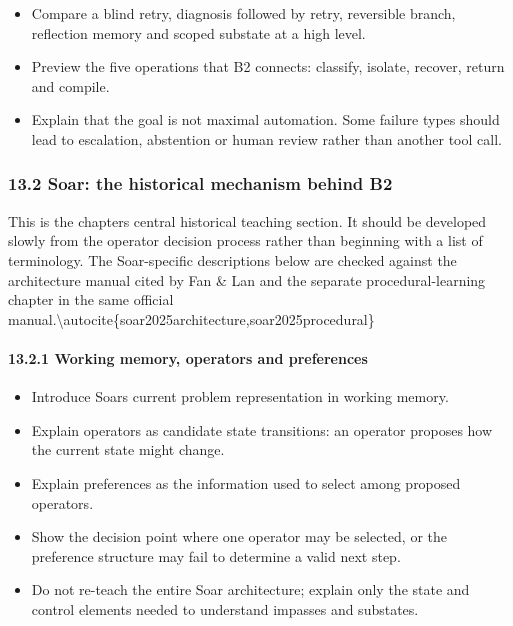 \begin{itemize}
\tightlist
\item
  Compare a blind retry, diagnosis followed by retry, reversible branch, reflection memory and scoped substate at a high level.
\item
  Preview the five operations that B2 connects: classify, isolate, recover, return and compile.
\item
  Explain that the goal is not maximal automation. Some failure types should lead to escalation, abstention or human review rather than another tool call.
\end{itemize}

\subsubsection{13.2 Soar: the historical mechanism behind B2}\label{132-soar-the-historical-mechanism-behind-b2}

This is the chapter\textquotesingle s central historical teaching section. It should be developed slowly from the operator decision process rather than beginning with a list of terminology. The Soar-specific descriptions below are checked against the architecture manual cited by Fan \& Lan and the separate procedural-learning chapter in the same official manual.\textbackslash autocite\{soar2025architecture,soar2025procedural\}

\paragraph{13.2.1 Working memory, operators and preferences}\label{1321-working-memory-operators-and-preferences}

\begin{itemize}
\tightlist
\item
  Introduce Soar\textquotesingle s current problem representation in working memory.
\item
  Explain operators as candidate state transitions: an operator proposes how the current state might change.
\item
  Explain preferences as the information used to select among proposed operators.
\item
  Show the decision point where one operator may be selected, or the preference structure may fail to determine a valid next step.
\item
  Do not re-teach the entire Soar architecture; explain only the state and control elements needed to understand impasses and substates.
\end{itemize}

